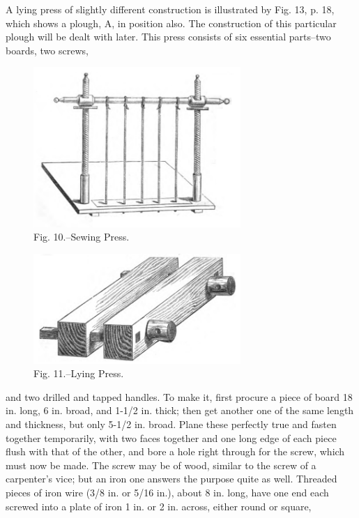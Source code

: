 \documentclass[twoside]{book}
\begin{document}
A lying press of slightly different construction is
illustrated by Fig. 13, p. 18, which shows a plough,
\pagebreak
A, in position also. The construction of this
particular plough will be dealt with later. This press
consists of six essential parts--two boards, two screws,
	\begin{figure}[h]
		\centering
		\includegraphics[width=0.7\textwidth]{Figures/_010.png}
		\caption*{Fig. 10.--Sewing Press.}
	\end{figure}
	\begin{figure}[h]
		\centering
		\includegraphics[width=0.7\textwidth]{Figures/_011.png}
		\caption*{Fig. 11.--Lying Press.}
	\end{figure}
and two drilled and tapped handles. To make it,
first procure a piece of board 18 in. long, 6 in.
broad, and 1-1/2 in. thick; then get another one of
the same length and thickness, but only 5-1/2 in.
broad. Plane these perfectly true and fasten
\pagebreak
together temporarily, with two faces together and
one long edge of each piece flush with that of the
other, and bore a hole right through for the screw,
which must now be made. The screw may be of
wood, similar to the screw of a carpenter's vice; but
an iron one answers the purpose quite as well.
Threaded pieces of iron wire (3/8 in. or 5/16 in.), about
8 in. long, have one end each screwed into a plate
of iron 1 in. or 2 in. across, either round or square,
\end{document}
